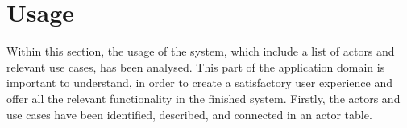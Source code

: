 \section{Usage}\label{sc:usage}
Within this section, the usage of the system, which include a list of actors and relevant use cases, has been analysed. This part of the application domain is important to understand, in order to create a satisfactory user experience and offer all the relevant functionality in the finished system. Firstly, the actors and use cases have been identified, described, and connected in an actor table.